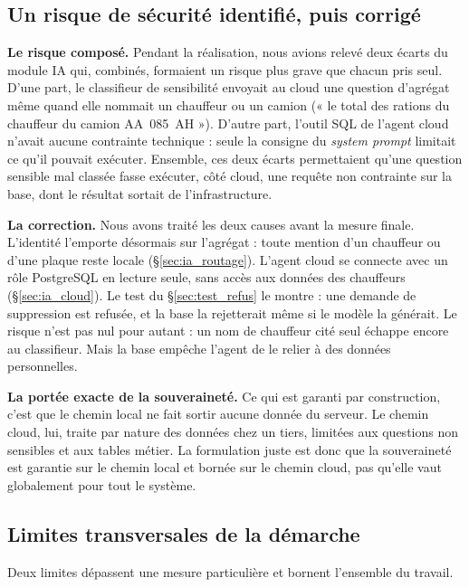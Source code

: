 \subsection{Un risque de sécurité identifié, puis corrigé}
\label{sec:disc_risque}

\textbf{Le risque composé.} Pendant la réalisation, nous avions relevé deux écarts du module IA qui, combinés, formaient un risque plus grave que chacun pris seul. D'une part, le classifieur de sensibilité envoyait au cloud une question d'agrégat même quand elle nommait un chauffeur ou un camion (« le total des rations du chauffeur du camion AA~085~AH »). D'autre part, l'outil SQL de l'agent cloud n'avait aucune contrainte technique : seule la consigne du \textit{system prompt} limitait ce qu'il pouvait exécuter. Ensemble, ces deux écarts permettaient qu'une question sensible mal classée fasse exécuter, côté cloud, une requête non contrainte sur la base, dont le résultat sortait de l'infrastructure.

\textbf{La correction.} Nous avons traité les deux causes avant la mesure finale. L'identité l'emporte désormais sur l'agrégat : toute mention d'un chauffeur ou d'une plaque reste locale (§\ref{sec:ia_routage}). L'agent cloud se connecte avec un rôle PostgreSQL en lecture seule, sans accès aux données des chauffeurs (§\ref{sec:ia_cloud}). Le test du §\ref{sec:test_refus} le montre : une demande de suppression est refusée, et la base la rejetterait même si le modèle la générait. Le risque n'est pas nul pour autant : un nom de chauffeur cité seul échappe encore au classifieur. Mais la base empêche l'agent de le relier à des données personnelles.

\textbf{La portée exacte de la souveraineté.} Ce qui est garanti par construction, c'est que le chemin local ne fait sortir aucune donnée du serveur. Le chemin cloud, lui, traite par nature des données chez un tiers, limitées aux questions non sensibles et aux tables métier. La formulation juste est donc que la souveraineté est garantie sur le chemin local et bornée sur le chemin cloud, pas qu'elle vaut globalement pour tout le système.

\subsection{Limites transversales de la démarche}
\label{sec:disc_limites}

Deux limites dépassent une mesure particulière et bornent l'ensemble du travail.

